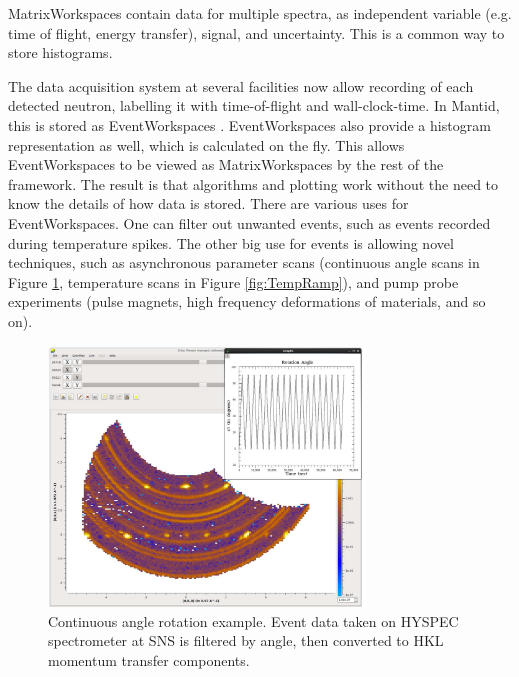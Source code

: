 \documentclass[1p]{elsarticle}
\begin{document}
MatrixWorkspaces contain data for multiple spectra, as independent variable (e.g. time of flight, energy transfer), signal, and uncertainty. This is a common way to store histograms. 

The data acquisition system at several facilities now allow recording of each  detected neutron, labelling it with time-of-flight and wall-clock-time. In Mantid, this is stored as EventWorkspaces \cite{EventPaper}. 
EventWorkspaces also provide a histogram representation as well, which is calculated on the fly. This allows EventWorkspaces to be viewed as MatrixWorkspaces by the rest of the framework. The result is that algorithms and plotting work without the need to know the details of how data is stored. 
There are various uses for EventWorkspaces. One can filter out unwanted events, such as events recorded during temperature spikes. The other big use for events is allowing novel techniques, such as asynchronous parameter scans (continuous angle scans in Figure \ref{fig:ContinuousRotation}, temperature scans in Figure \ref{fig:TempRamp}), and pump probe experiments (pulse magnets, high frequency deformations of materials, and so on).

\begin{figure}[!ht]
\centerline{\includegraphics[width=0.75\textwidth]{ContinuousRotation.pdf}}
\caption{Continuous angle rotation example. Event data taken on HYSPEC spectrometer at SNS is filtered by angle, then converted to HKL momentum transfer components.}
\label{fig:ContinuousRotation}
\end{figure}
 
\end{document}
